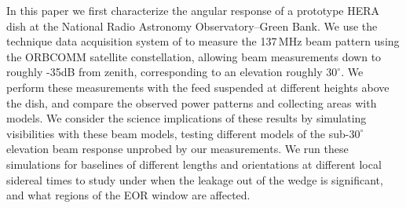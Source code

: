 \documentclass{emulateapj}
\begin{document}

In this paper we first characterize the angular response of a prototype HERA dish at the National Radio 
Astronomy Observatory--Green Bank. We use the technique data acquisition system of \citet{neben15} to 
measure the 137\,MHz beam pattern using the ORBCOMM satellite constellation, allowing beam 
measurements down to roughly -35dB from zenith, corresponding to an elevation roughly $30^\circ$. We 
perform these measurements with the feed suspended at different heights above the dish, and compare the 
observed power patterns and collecting areas with models. We consider the science implications of these 
results by simulating visibilities with these beam models, testing different models of the sub-$30^\circ$ 
elevation beam response unprobed by our measurements. We run these simulations for baselines of different 
lengths and orientations at different local sidereal times to study under when the leakage out of the wedge is 
significant, and what regions of the EOR window are affected.
\end{document}
